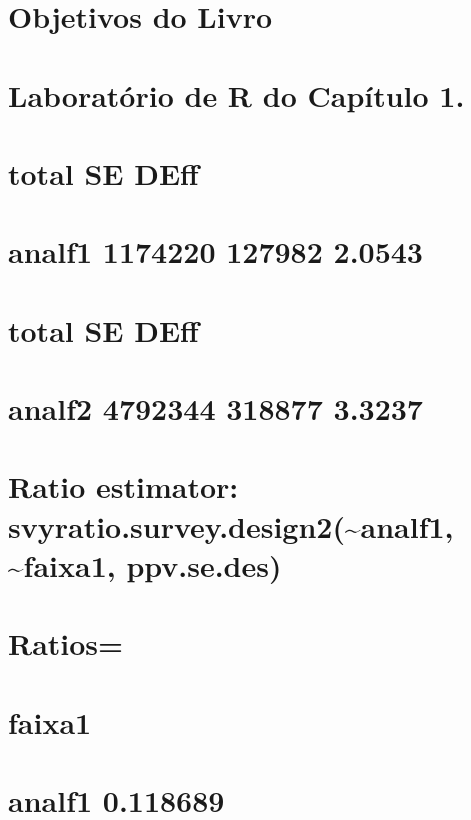 \documentclass[]{book}
\theoremstyle{definition}
\theoremstyle{definition}
\theoremstyle{definition}
\theoremstyle{remark}
\begin{document}
\section{Objetivos do Livro}\label{objetivos-do-livro}

\section{Laboratório de R do Capítulo 1.}\label{epa}

\section{total SE DEff}\label{total-se-deff}

\section{analf1 1174220 127982
2.0543}\label{analf1-1174220-127982-2.0543}

\section{total SE DEff}\label{total-se-deff-1}

\section{analf2 4792344 318877
3.3237}\label{analf2-4792344-318877-3.3237}

\section{Ratio estimator:
svyratio.survey.design2(\textasciitilde{}analf1,
\textasciitilde{}faixa1,
ppv.se.des)}\label{ratio-estimator-svyratio.survey.design2analf1-faixa1-ppv.se.des}

\section{Ratios=}\label{ratios}

\section{faixa1}\label{faixa1}

\section{analf1 0.118689}\label{analf1-0.118689}
\end{document}
